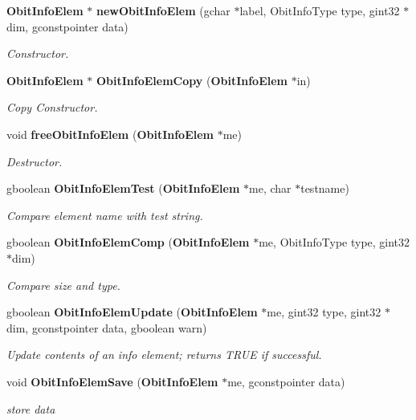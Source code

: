 \begin{CompactItemize}
\item 
{\bf Obit\-Info\-Elem} $\ast$ {\bf new\-Obit\-Info\-Elem} (gchar $\ast$label, Obit\-Info\-Type type, gint32 $\ast$dim, gconstpointer data)
\begin{CompactList}\small\item\em Constructor. \item\end{CompactList}\item 
{\bf Obit\-Info\-Elem} $\ast$ {\bf Obit\-Info\-Elem\-Copy} ({\bf Obit\-Info\-Elem} $\ast$in)
\begin{CompactList}\small\item\em Copy Constructor. \item\end{CompactList}\item 
void {\bf free\-Obit\-Info\-Elem} ({\bf Obit\-Info\-Elem} $\ast$me)
\begin{CompactList}\small\item\em Destructor. \item\end{CompactList}\item 
gboolean {\bf Obit\-Info\-Elem\-Test} ({\bf Obit\-Info\-Elem} $\ast$me, char $\ast$testname)
\begin{CompactList}\small\item\em Compare element name with test string. \item\end{CompactList}\item 
gboolean {\bf Obit\-Info\-Elem\-Comp} ({\bf Obit\-Info\-Elem} $\ast$me, Obit\-Info\-Type type, gint32 $\ast$dim)
\begin{CompactList}\small\item\em Compare size and type. \item\end{CompactList}\item 
gboolean {\bf Obit\-Info\-Elem\-Update} ({\bf Obit\-Info\-Elem} $\ast$me, gint32 type, gint32 $\ast$dim, gconstpointer data, gboolean warn)
\begin{CompactList}\small\item\em Update contents of an info element; returns TRUE if successful. \item\end{CompactList}\item 
void {\bf Obit\-Info\-Elem\-Save} ({\bf Obit\-Info\-Elem} $\ast$me, gconstpointer data)
\begin{CompactList}\small\item\em store data \item\end{CompactList}\item 

\end{CompactItemize}
